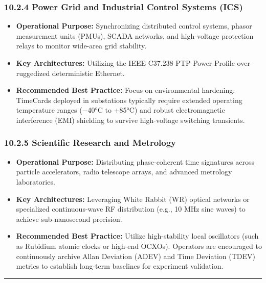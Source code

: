 \subsubsection{10.2.4 Power Grid and Industrial Control Systems
(ICS)}\label{power-grid-and-industrial-control-systems-ics}

\begin{itemize}
\tightlist
\item
  \textbf{Operational Purpose:} Synchronizing distributed control
  systems, phasor measurement units (PMUs), SCADA networks, and
  high-voltage protection relays to monitor wide-area grid stability.
\item
  \textbf{Key Architectures:} Utilizing the IEEE C37.238 PTP Power
  Profile over ruggedized deterministic Ethernet.
\item
  \textbf{Recommended Best Practice:} Focus on environmental hardening.
  TimeCards deployed in substations typically require extended operating
  temperature ranges (−40°C to +85°C) and robust electromagnetic
  interference (EMI) shielding to survive high-voltage switching
  transients.
\end{itemize}

\subsubsection{10.2.5 Scientific Research and
Metrology}\label{scientific-research-and-metrology}

\begin{itemize}
\tightlist
\item
  \textbf{Operational Purpose:} Distributing phase-coherent time
  signatures across particle accelerators, radio telescope arrays, and
  advanced metrology laboratories.
\item
  \textbf{Key Architectures:} Leveraging White Rabbit (WR) optical
  networks or specialized continuous-wave RF distribution (e.g., 10 MHz
  sine waves) to achieve sub-nanosecond precision.
\item
  \textbf{Recommended Best Practice:} Utilize high-stability local
  oscillators (such as Rubidium atomic clocks or high-end OCXOs).
  Operators are encouraged to continuously archive Allan Deviation
  (ADEV) and Time Deviation (TDEV) metrics to establish long-term
  baselines for experiment validation.
\end{itemize}

\begin{center}\rule{0.5\linewidth}{0.5pt}\end{center}

